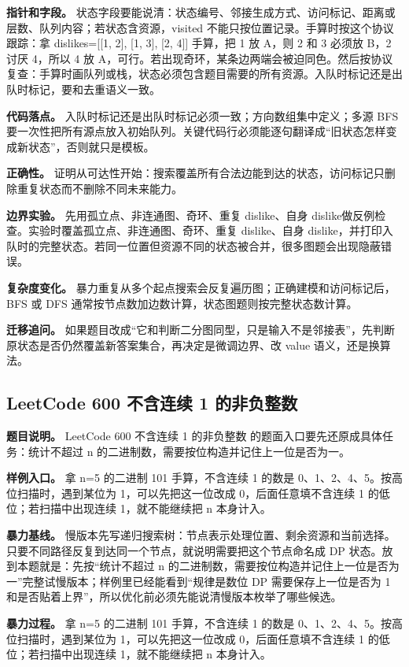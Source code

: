 \textbf{指针和字段。} 状态字段要能说清：状态编号、邻接生成方式、访问标记、距离或层数、队列内容；若状态含资源，visited 不能只按位置记录。手算时按这个协议跟踪：拿 dislikes=[[1, 2], [1, 3], [2, 4]] 手算，把 1 放 A，则 2 和 3 必须放 B，2 讨厌 4，所以 4 放 A，可行。若出现奇环，某条边两端会被迫同色。然后按协议复查：手算时画队列或栈，状态必须包含题目需要的所有资源。入队时标记还是出队时标记，要和去重语义一致。

\textbf{代码落点。} 入队时标记还是出队时标记必须一致；方向数组集中定义；多源 BFS 要一次性把所有源点放入初始队列。关键代码行必须能逐句翻译成“旧状态怎样变成新状态”，否则就只是模板。

\textbf{正确性。} 证明从可达性开始：搜索覆盖所有合法边能到达的状态，访问标记只删除重复状态而不删除不同未来能力。

\textbf{边界实验。} 先用孤立点、非连通图、奇环、重复 dislike、自身 dislike做反例检查。实验时覆盖孤立点、非连通图、奇环、重复 dislike、自身 dislike，并打印入队时的完整状态。若同一位置但资源不同的状态被合并，很多图题会出现隐蔽错误。

\textbf{复杂度变化。} 暴力重复从多个起点搜索会反复遍历图；正确建模和访问标记后，BFS 或 DFS 通常按节点数加边数计算，状态图题则按完整状态数计算。

\textbf{迁移追问。} 如果题目改成“它和判断二分图同型，只是输入不是邻接表”，先判断原状态是否仍然覆盖新答案集合，再决定是微调边界、改 value 语义，还是换算法。

\subsection{LeetCode 600 不含连续 1 的非负整数}

\textbf{题目说明。} LeetCode 600 不含连续 1 的非负整数 的题面入口要先还原成具体任务：统计不超过 n 的二进制数，需要按位构造并记住上一位是否为一。

\textbf{样例入口。} 拿 n=5 的二进制 101 手算，不含连续 1 的数是 0、1、2、4、5。按高位扫描时，遇到某位为 1，可以先把这一位改成 0，后面任意填不含连续 1 的低位；若扫描中出现连续 1，就不能继续把 n 本身计入。

\textbf{暴力基线。} 慢版本先写递归搜索树：节点表示处理位置、剩余资源和当前选择。只要不同路径反复到达同一个节点，就说明需要把这个节点命名成 DP 状态。放到本题就是：先按“统计不超过 n 的二进制数，需要按位构造并记住上一位是否为一”完整试慢版本；样例里已经能看到“规律是数位 DP 需要保存上一位是否为 1 和是否贴着上界”，所以优化前必须先能说清慢版本枚举了哪些候选。

\textbf{暴力过程。} 拿 n=5 的二进制 101 手算，不含连续 1 的数是 0、1、2、4、5。按高位扫描时，遇到某位为 1，可以先把这一位改成 0，后面任意填不含连续 1 的低位；若扫描中出现连续 1，就不能继续把 n 本身计入。

